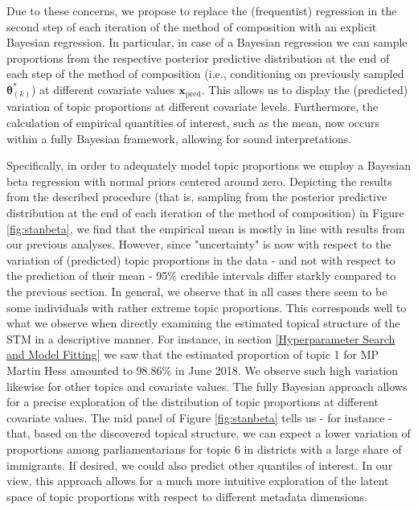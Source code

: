 Due to these concerns, we propose to replace the (frequentist) regression in the second step of each iteration of the method of composition with an explicit Bayesian regression. In particular, in case of a Bayesian regression we can sample proportions from the respective posterior predictive distribution at the end of each step of the method of composition (i.e., conditioning on previously sampled $\boldsymbol{\theta}_{(k)}^*$) at different covariate values $\boldsymbol{x}_{\text{pred}}$. This allows us to display the (predicted) variation of topic proportions at different covariate levels. Furthermore, the calculation of empirical quantities of interest, such as the mean, now occurs within a fully Bayesian framework, allowing for sound interpretations.

Specifically, in order to adequately model topic proportions we employ a Bayesian beta regression with normal priors centered around zero. Depicting the results from the described procedure (that is, sampling from the posterior predictive distribution at the end of each iteration of the method of composition) in Figure \ref{fig:stanbeta}, we find that the empirical mean is mostly in line with results from our previous analyses. However, since "uncertainty" is now with respect to the variation of (predicted) topic proportions in the data - and not with respect to the prediction of their mean - 95\% credible intervals differ starkly compared to the previous section. In general, we observe that in all cases there seem to be some individuals with rather extreme topic proportions. This corresponds well to what we observe when directly examining the estimated topical structure of the STM in a descriptive manner. For instance, in section \ref{Hyperparameter Search and Model Fitting} we saw that the estimated proportion of topic 1 for MP Martin Hess amounted to 98.86\% in June 2018. We observe such high variation likewise for other topics and covariate values. The fully Bayesian approach allows for a precise exploration of the distribution of topic proportions at different covariate values. The mid panel of Figure \ref{fig:stanbeta} tells us - for instance - that, based on the discovered topical structure, we can expect a lower variation of proportions among parliamentarians for topic 6 in districts with a large share of immigrants. If desired, we could also predict other quantiles of interest. In our view, this approach allows for a much more intuitive exploration of the latent space of topic proportions with respect to different metadata dimensions. 

